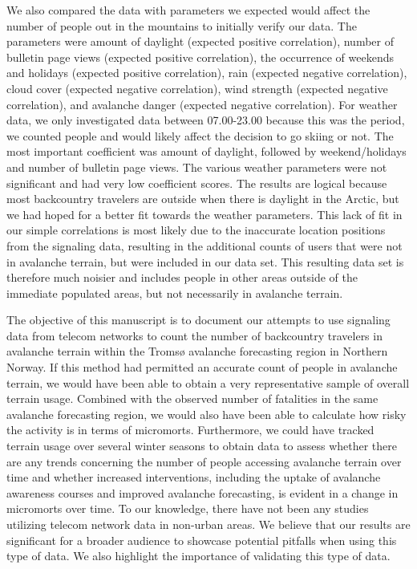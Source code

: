 \documentclass[authordate,empirical, issue]{jote-new-article}
\begin{document}
We also compared the data with parameters we expected would affect the number of people out in the mountains to initially verify our data. The parameters were amount of daylight (expected positive correlation), number of bulletin page views (expected positive correlation), the occurrence of weekends and holidays (expected positive correlation), rain (expected negative correlation), cloud cover (expected negative correlation), wind strength (expected negative correlation), and avalanche danger (expected negative correlation). For weather data, we only investigated data between 07.00-23.00 because this was the period, we counted people and would likely affect the decision to go skiing or not. The most important coefficient was amount of daylight, followed by weekend/holidays and number of bulletin page views. The various weather parameters were not significant and had very low coefficient scores. The results are logical because most backcountry travelers are outside when there is daylight in the Arctic, but we had hoped for a better fit towards the weather parameters. This lack of fit in our simple correlations is most likely due to the inaccurate location positions from the signaling data, resulting in the additional counts of users that were not in avalanche terrain, but were included in our data set. This resulting data set is therefore much noisier and includes people in other areas outside of the immediate populated areas, but not necessarily in avalanche terrain.




\begin{originalPurpose}

  The objective of this manuscript is to document our attempts to use signaling data from telecom networks to count the number of backcountry travelers in avalanche terrain within the Tromsø avalanche forecasting region in Northern Norway. If this method had permitted an accurate count of people in avalanche terrain, we would have been able to obtain a very representative sample of overall terrain usage. Combined with the observed number of fatalities in the same avalanche forecasting region, we would also have been able to calculate how risky the activity is in terms of micromorts. Furthermore, we could have tracked terrain usage over several winter seasons to obtain data to assess whether there are any trends concerning the number of people accessing avalanche terrain over time and whether increased interventions, including the uptake of avalanche awareness courses and improved avalanche forecasting, is evident in a change in micromorts over time. To our knowledge, there have not been any studies utilizing telecom network data in non-urban areas. We believe that our results are significant for a broader audience to showcase potential pitfalls when using this type of data. We also highlight the importance of validating this type of data.




\end{originalPurpose}
\end{document}
